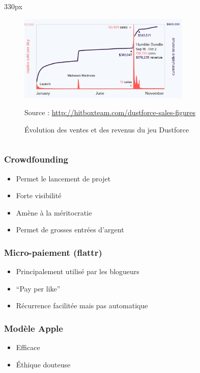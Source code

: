 \begin{frame}
\begin{center}
\begin{columns}
\begin{column}{330px}
{
    \begin{figure}[h!]
        \centering
        \includegraphics[width=310px]
            {images/section1/courbe-ventes-dustforce.eps}
        \caption{Évolution des ventes et des revenus du jeu Dustforce}
        \scriptsize{Source :
            \url{http://hitboxteam.com/dustforce-sales-figures}}
    \end{figure}
}
\end{column}
\end{columns}
\end{center}
\end{frame}


\begin{frame}   %
\frametitle{Crowdfounding}

\begin{itemize}
    \itemsep1.5em
    \item Permet le lancement de projet
    \item Forte visibilité
    \item Amène à la méritocratie
    \item Permet de grosses entrées d'argent
\end{itemize}
\end{frame}


\begin{frame}
\frametitle{Micro-paiement (flattr)}

\begin{itemize}
    \itemsep1.5em
    \item Principalement utilisé par les blogueurs
    \item ``Pay per like''
    \item Récurrence facilitée mais pas automatique
\end{itemize}
\end{frame}


\begin{frame}
\frametitle{Modèle Apple}

\begin{itemize}
    \itemsep1.5em
    \item Efficace
    \item Éthique douteuse
\end{itemize}
\end{frame}


